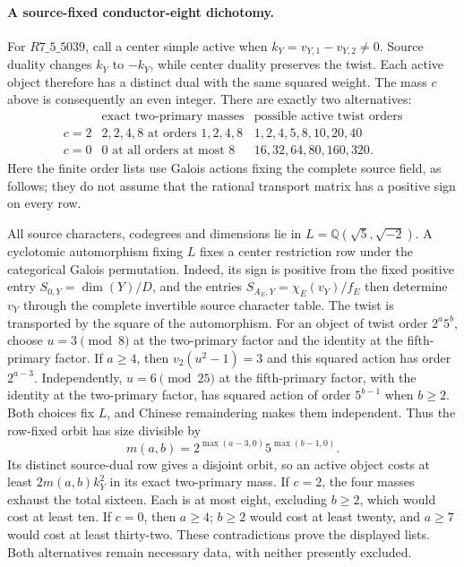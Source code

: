 \paragraph{A source-fixed conductor-eight dichotomy.}
For $R7\_5\_5039$, call a center simple active when
$k_Y=v_{Y,1}-v_{Y,2}\ne0$.  Source duality changes $k_Y$ to $-k_Y$,
while center duality preserves the twist.  Each active object therefore
has a distinct dual with the same squared weight.  The mass $c$ above
is consequently an even integer.  There are exactly two alternatives:
\[
\begin{array}{c|l|l}
 &\text{exact two-primary masses}&\text{possible active twist orders}\\\hline
c=2&2,2,4,8\text{ at orders }1,2,4,8&1,2,4,5,8,10,20,40\\
c=0&0\text{ at all orders at most }8&16,32,64,80,160,320.
\end{array}
\]
Here the finite order lists use Galois actions fixing the complete
source field, as follows; they do not assume that the rational
transport matrix has a positive sign on every row.

All source characters, codegrees and dimensions lie in
$L=\mathbb Q(\sqrt5,\sqrt{-2})$.  A cyclotomic automorphism fixing
$L$ fixes a center restriction row under the categorical Galois
permutation.  Indeed, its sign is positive from the fixed positive
entry $S_{0,Y}=\dim(Y)/D$, and the entries
$S_{A_E,Y}=\chi_E(v_Y)/f_E$ then determine $v_Y$ through the complete
invertible source character table.  The twist is transported by the
square of the automorphism.  For an object of twist order $2^a5^b$,
choose $u=3\pmod8$ at the two-primary factor and the identity at the
fifth-primary factor.  If $a\geq4$, then
$v_2(u^2-1)=3$ and this squared action has order $2^{a-3}$.
Independently, $u=6\pmod{25}$ at the fifth-primary factor, with the
identity at the two-primary factor, has squared action of order
$5^{b-1}$ when $b\geq2$.  Both choices fix $L$, and Chinese
remaindering makes them independent.  Thus the row-fixed orbit has
size divisible by
\[
 m(a,b)=2^{\max(a-3,0)}5^{\max(b-1,0)}.
\]
Its distinct source-dual row gives a disjoint orbit, so an active
object costs at least $2m(a,b)k_Y^2$ in its exact two-primary mass.
If $c=2$, the four masses exhaust the total sixteen.  Each is at
most eight, excluding $b\geq2$, which would cost at least ten.
If $c=0$, then $a\geq4$; $b\geq2$ would cost at least twenty,
and $a\geq7$ would cost at least thirty-two.  These contradictions
prove the displayed lists.  Both alternatives remain necessary data,
with neither presently excluded.

